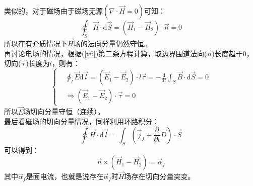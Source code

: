 \documentclass[12pt]{article}
\begin{document}
类似的，对于磁场由于磁场无源$(\nabla \cdot \Vec{H}=0)$可知：
\begin{equation}
    \oint_S \Vec{H}\cdot \mathrm{d}\Vec{S}=(\Vec{H}_1-\Vec{H}_2)\cdot \Vec{n}=0
\end{equation}
所以在有介质情况下$\Vec{H}$场的法向分量仍然守恒。\\
再讨论电场的情况，根据(\ref{x6})第二条方程计算，取边界围道法向($\Vec{n}$)长度趋于0，切向($\Vec{\tau}$)长度为$l$，则有：
\begin{equation}
\left\{\begin{split}
    &\oint_l \Vec{E}\mathrm{d}\Vec{l}=(\Vec{E}_1-\Vec{E}_2)\cdot l\Vec{\tau}=-\frac{\mathrm{d}}{\mathrm{d}t}\int_S \Vec{B}\cdot\mathrm{d}\Vec{S}=0\\
&\Rightarrow (\Vec{E}_1-\Vec{E}_2)\cdot \Vec{\tau}=0
\end{split}\right.
\end{equation}
所以$\Vec{E}$场切向分量守恒（连续）。\\
最后看磁场的切向分量情况，同样利用环路积分：
\begin{equation}
    \oint \Vec{H}\cdot\mathrm{d}\Vec{l}=\int_S (\Vec{j}_f+\frac{\partial}{\partial t}\Vec{D})\cdot\Vec{S}
\end{equation}
可以得到：
\begin{equation}
    \Vec{n}\times (\Vec{H}_1-\Vec{H}_2)=\Vec{\alpha}_f
\end{equation}
其中$\Vec{\alpha}_f$是面电流，也就是说存在$\Vec{\alpha}_f$时$\Vec{H}$场存在切向分量突变。
\end{document}
